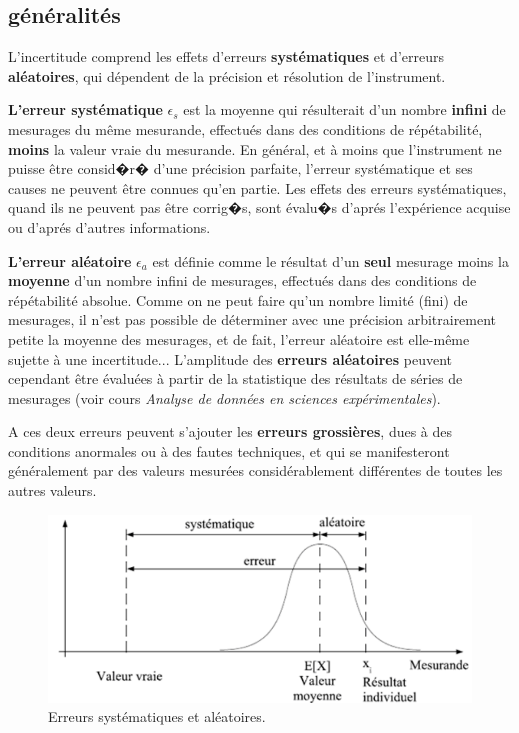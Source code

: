 \subsection{généralités}

L'incertitude comprend les effets d'erreurs \textbf{systématiques} et d'erreurs \textbf{aléatoires}, qui dépendent de la précision et résolution de l'instrument.

\textbf{L'erreur systématique} $\epsilon_s$ est la moyenne qui résulterait d'un nombre \textbf{infini} de mesurages du même mesurande, effectués dans des conditions de répétabilité, \textbf{moins} la valeur vraie du mesurande. En général, et à moins que l'instrument ne puisse être consid�r� d'une précision parfaite, l'erreur systématique et ses causes ne peuvent être connues qu'en partie. Les effets des erreurs systématiques, quand ils ne peuvent pas être corrig�s, sont évalu�s d'aprés l'expérience acquise ou d'aprés d'autres informations.

\textbf{L'erreur aléatoire} $\epsilon_a$ est définie comme le résultat d'un \textbf{seul} mesurage moins la \textbf{moyenne} d'un nombre infini de mesurages, effectués dans des conditions de répétabilité absolue. Comme on ne peut faire qu'un nombre limité (fini) de mesurages, il n'est pas possible de déterminer avec une précision arbitrairement petite la moyenne des mesurages, et de fait, l'erreur aléatoire est elle-même sujette à une incertitude... L'amplitude des \textbf{erreurs aléatoires} peuvent cependant être évaluées à partir de la statistique des résultats de séries de mesurages (voir cours \textit{Analyse de données en sciences expérimentales}).

A ces deux erreurs peuvent s'ajouter les \textbf{erreurs grossières}, dues à des conditions anormales ou à des fautes techniques, et qui se manifesteront généralement par des valeurs mesurées considérablement différentes de toutes les autres valeurs.
\begin{figure}[t]
   \centering
   \includegraphics[width=14cm]{assets/figures/errsysale.pdf}
   \caption{Erreurs systématiques et aléatoires.}
   \label{fig:example}
\end{figure}

